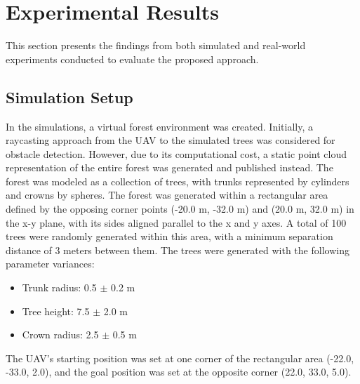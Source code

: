     \section{Experimental Results}
    \label{sec:experimental_results}
        This section presents the findings from both simulated and real-world experiments conducted to evaluate the proposed approach.
        \subsection{Simulation Setup}
            In the simulations, a virtual forest environment was created. 
            Initially, a raycasting approach from the \ac{UAV} to the simulated trees was considered for obstacle detection. 
            However, due to its computational cost, a static point cloud representation of the entire forest was generated and published instead. 
            The forest was modeled as a collection of trees, with trunks represented by cylinders and crowns by spheres.
            The forest was generated within a rectangular area defined by the opposing corner points (-20.0 m, -32.0 m) and (20.0 m, 32.0 m) in the x-y plane, with its sides aligned parallel to the x and y axes.
            A total of 100 trees were randomly generated within this area, with a minimum separation distance of 3 meters between them. 
            The trees were generated with the following parameter variances:
            \begin{itemize}
                \item Trunk radius: 0.5 $\pm$ 0.2 m
                \item Tree height: 7.5 $\pm$ 2.0 m
                \item Crown radius: 2.5 $\pm$ 0.5 m
            \end{itemize}
            The \ac{UAV}'s starting position was set at one corner of the rectangular area (-22.0, -33.0, 2.0), and the goal position was set at the opposite corner (22.0, 33.0, 5.0).

